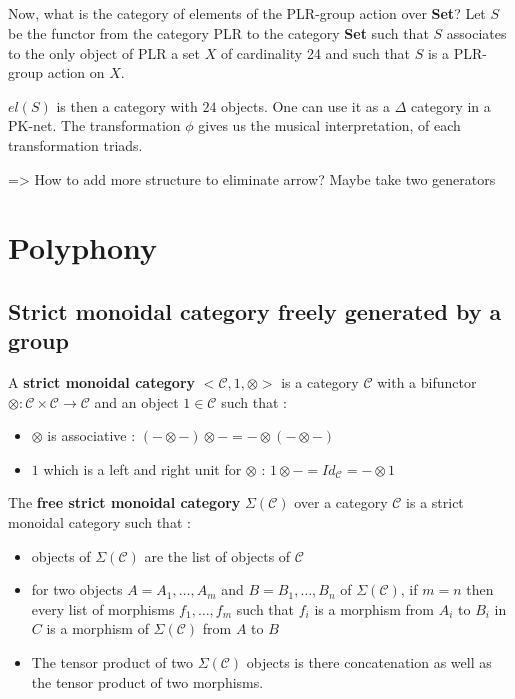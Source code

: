 \documentclass{report}
\begin{document}
\paragraph{}
Now, what is the category of elements of the PLR-group action over \textbf{Set}? Let $S$ be the functor from the category PLR to the category \textbf{Set} such that $S$ associates to the only object of PLR a set $X$ of cardinality 24 and such that $S$ is a PLR-group action on $X$.

$el(S)$ is then a category with $24$ objects. One can use it as a $\Delta$ category in a PK-net. The transformation $\phi$ gives us the musical interpretation, of each transformation triads.

=> How to add more structure to eliminate arrow? Maybe take two generators

\chapter{Polyphony}
\section{Strict monoidal category freely generated by a group}

\begin{defn}
    A \textbf{strict monoidal category}\cite{lane_1971} $\big<\mathcal{C},1,\otimes\big>$ is a category $\mathcal{C}$ with a bifunctor $\otimes : \mathcal{C}\times\mathcal{C} \rightarrow \mathcal{C}$ and an object $1\in\mathcal{C}$ such that :
    \begin{itemize}
        \item $\otimes$ is associative : $(-\otimes-)\otimes - = - \otimes (-\otimes-)$
        \item $1$ which is a left and right unit for $\otimes$ : $1\otimes - = Id_{\mathcal{C}} = - \otimes 1$
    \end{itemize}
\end{defn}


\begin{defn}
    The \textbf{free strict monoidal category} $ \Sigma (\mathcal{C})$ over a category $\mathcal{C}$ is a strict monoidal category such that :
    \begin{itemize}
        \item objects of $\Sigma (\mathcal{C})$ are the list of objects of $\mathcal{C}$
        \item for two objects $A = A_1,\dots,A_m$ and $B = B_1,\dots,B_n$ of $\Sigma (\mathcal{C})$, if $m = n$ then every list of morphisms $f_1,\dots,f_m$ such that $f_i$ is a morphism from $A_i$ to $B_i$ in $C$ is a morphism of $\Sigma(\mathcal{C})$ from $A$ to $B$
        \item The tensor product of two $\Sigma(\mathcal{C})$ objects is there concatenation as well as the tensor product of two morphisms.
    \end{itemize}
\end{defn}
\end{document}
